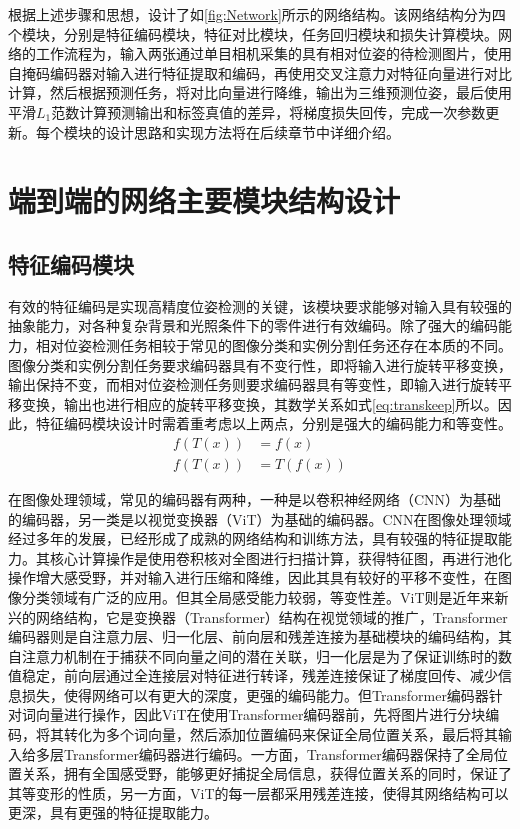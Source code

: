 \documentclass{Diploma}
\begin{document}
根据上述步骤和思想，设计了如\ref{fig:Network}所示的网络结构。该网络结构分为四个模块，分别是特征编码模块，特征对比模块，任务回归模块和损失计算模块。网络的工作流程为，输入两张通过单目相机采集的具有相对位姿的待检测图片，使用自掩码编码器对输入进行特征提取和编码，再使用交叉注意力对特征向量进行对比计算，然后根据预测任务，将对比向量进行降维，输出为三维预测位姿，最后使用平滑$L_{1}$范数计算预测输出和标签真值的差异，将梯度损失回传，完成一次参数更新。每个模块的设计思路和实现方法将在后续章节中详细介绍。
%

\section{端到端的网络主要模块结构设计}
\subsection{特征编码模块}
有效的特征编码是实现高精度位姿检测的关键，该模块要求能够对输入具有较强的抽象能力，对各种复杂背景和光照条件下的零件进行有效编码。除了强大的编码能力，相对位姿检测任务相较于常见的图像分类和实例分割任务还存在本质的不同。图像分类和实例分割任务要求编码器具有不变行性，即将输入进行旋转平移变换，输出保持不变，而相对位姿检测任务则要求编码器具有等变性，即输入进行旋转平移变换，输出也进行相应的旋转平移变换，其数学关系如式\eqref{eq:transkeep}所以。因此，特征编码模块设计时需着重考虑以上两点，分别是强大的编码能力和等变性。
  \begin{equation} \label{eq:transkeep}
    \begin{aligned}
    f(T(x)) &= f(x) \\
    f(T(x)) &= T(f(x)) 
    \end{aligned}
  \end{equation}

  在图像处理领域，常见的编码器有两种，一种是以卷积神经网络（CNN）为基础的编码器，另一类是以视觉变换器（ViT）为基础的编码器。CNN在图像处理领域经过多年的发展，已经形成了成熟的网络结构和训练方法，具有较强的特征提取能力。其核心计算操作是使用卷积核对全图进行扫描计算，获得特征图，再进行池化操作增大感受野，并对输入进行压缩和降维，因此其具有较好的平移不变性，在图像分类领域有广泛的应用\cite{he2016deep}。但其全局感受能力较弱，等变性差。ViT则是近年来新兴的网络结构，它是变换器（Transformer）结构在视觉领域的推广\cite{dosovitskiy2020image}，Transformer编码器则是自注意力层、归一化层、前向层和残差连接为基础模块的编码结构，其自注意力机制在于捕获不同向量之间的潜在关联，归一化层是为了保证训练时的数值稳定，前向层通过全连接层对特征进行转译，残差连接保证了梯度回传、减少信息损失，使得网络可以有更大的深度，更强的编码能力\cite{vaswani2017attention}。但Transformer编码器针对词向量进行操作，因此ViT在使用Transformer编码器前，先将图片进行分块编码，将其转化为多个词向量，然后添加位置编码来保证全局位置关系，最后将其输入给多层Transformer编码器进行编码。一方面，Transformer编码器保持了全局位置关系，拥有全国感受野，能够更好捕捉全局信息，获得位置关系的同时，保证了其等变形的性质，另一方面，ViT的每一层都采用残差连接，使得其网络结构可以更深，具有更强的特征提取能力。
\end{document}
